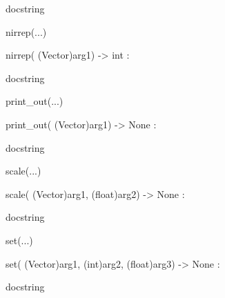 \documentclass[letterpaper,10pt,english]{sphinxmanual}
\begin{document}
\begin{description}
\begin{description}
\begin{DUlineblock}{0em}
\begin{DUlineblock}{\DUlineblockindent}
\begin{DUlineblock}{\DUlineblockindent}
\item[] docstring
\item[] 
\end{DUlineblock}
\end{DUlineblock}
\item[] nirrep(...)
\item[]
\begin{DUlineblock}{\DUlineblockindent}
\item[] nirrep( (Vector)arg1) -\textgreater{} int :
\item[]
\begin{DUlineblock}{\DUlineblockindent}
\item[] docstring
\item[] 
\end{DUlineblock}
\end{DUlineblock}
\item[] print\_out(...)
\item[]
\begin{DUlineblock}{\DUlineblockindent}
\item[] print\_out( (Vector)arg1) -\textgreater{} None :
\item[]
\begin{DUlineblock}{\DUlineblockindent}
\item[] docstring
\item[] 
\end{DUlineblock}
\end{DUlineblock}
\item[] scale(...)
\item[]
\begin{DUlineblock}{\DUlineblockindent}
\item[] scale( (Vector)arg1, (float)arg2) -\textgreater{} None :
\item[]
\begin{DUlineblock}{\DUlineblockindent}
\item[] docstring
\item[] 
\end{DUlineblock}
\end{DUlineblock}
\item[] set(...)
\item[]
\begin{DUlineblock}{\DUlineblockindent}
\item[] set( (Vector)arg1, (int)arg2, (float)arg3) -\textgreater{} None :
\item[]
\begin{DUlineblock}{\DUlineblockindent}
\item[] docstring

\end{DUlineblock}
\end{DUlineblock}
\end{DUlineblock}
\end{description}
\end{description}
\end{document}
